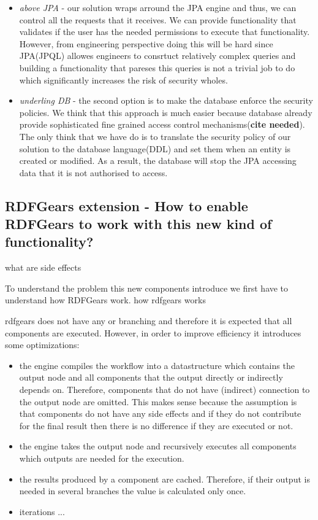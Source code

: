 \documentclass[a4paper, notitlepage]{article}
\begin{document}
\begin{itemize}
	\item \textit{above JPA} - our solution wraps arround the JPA engine and thus, we can control all the requests that it receives. We can provide functionality that validates if the user has the needed permissions to execute that functionality. However, from engineering perspective doing this will be hard since JPA(JPQL) allowes engineers to consrtuct relatively complex queries and building a functionality that pareses this queries is not a trivial job to do which significantly increases the risk of security wholes.
	
	\item \textit{underling DB} - the second option is to make the database enforce the security policies. We think that this approach is much easier because database already provide sophisticated fine grained access control mechanisms(\textbf{cite needed}). The only think that we have do is to translate the security policy of our solution to the database language(DDL) and set them when an entity is created or modified. As a result, the database will stop the JPA accessing data that it is not authorised to access.
\end{itemize}

\subsection{RDFGears extension - How to enable RDFGears to work with this new kind of functionality?}
what are side effects

To understand the problem this new components introduce we first have to understand how RDFGears work. 
how rdfgears works

rdfgears does not have any or branching and therefore it is expected that all components are executed. However, in order to improve efficiency it introduces some optimizations:
\begin{itemize}
	\item the engine compiles the workflow into a datastructure which contains the output node and all components that the output directly or indirectly depends on. Therefore, components that do not have (indirect) connection to the output node are omitted. This makes sense because the assumption is that components do not have any side effects and if they do not contribute for the final result then there is no difference if they are executed or not.
	
	\item the engine takes the output node and recursively executes all components which outputs are needed for the execution.
	  
	\item the results produced by a component are cached. Therefore, if their output is needed in several branches the value is calculated only once.
	
	\item iterations ...  
\end{itemize}
\end{document}

